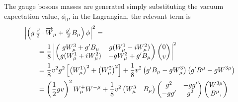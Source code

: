 The gauge bosons masses are generated simply substituting the vacuum
expectation value, $\phi_{0}$, in the Lagrangian, the relevant term is
\begin{equation}
  \label{eq:48}
  \begin{aligned}
     \MoveEqLeft \left| \left( g\,\tfrac{\vec \tau}{2} \cdot \vect{W}_{\mu} +
      \tfrac{g'}{2}
      B_{\mu} \right) \phi \right|^{2} = \\
    &= \frac{1}{8} \left|
      \begin{pmatrix}
        g W^{3}_{\mu} + g' B_{\mu} & g(W^{1}_{\mu} - i W^{2}_{\mu}) \\
        g(W^{1}_{\mu} + iW^{2}_{\mu}) & -g W^{3}_{\mu} + g' B_{\mu}
      \end{pmatrix}
      \binom{0}{v} \right|^{2} \\
    &= \frac{1}{8} v^{2}g^{2} \left[ \left(W^{1}_{\mu} \right)^{2} + \left(W^{2}_{\mu} \right)^{2} \right]
    + \frac{1}{8} v^{2} \left(g' B_{\mu} - g W_{\mu}^{3} \right) \left( g' B^{\mu} - g
    W^{3
      \mu} \right) \\
    &= \left(\frac{1}{2} gv \right)^{2} W^{+}_{\mu}W^{- \mu} + \frac{1}{8} v^{2}
    \begin{pmatrix}
      W_{\mu}^{3} & B_{\mu}
    \end{pmatrix}
    \begin{pmatrix}
      g^{2} & - g g' \\
      - g g' & g^{2}
    \end{pmatrix}
    \begin{pmatrix}
      W^{3 \mu} \\ B^{\mu},
    \end{pmatrix}
  \end{aligned}
\end{equation}
